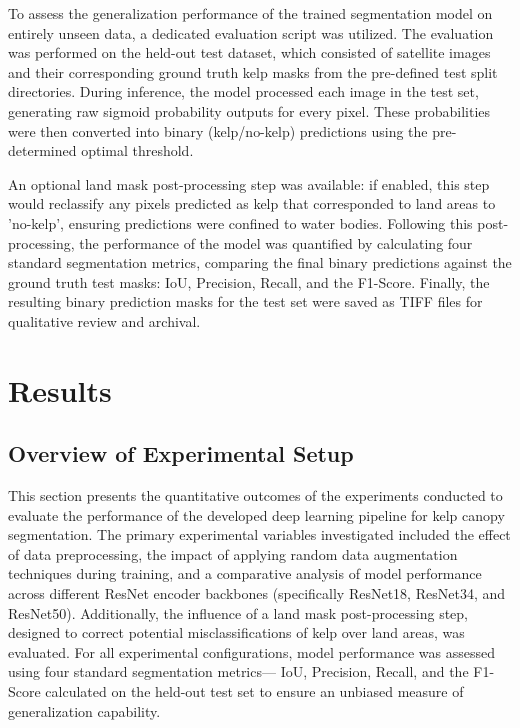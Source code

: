 \documentclass{article}
\begin{document}
To assess the generalization performance of the trained segmentation model on entirely unseen data, a dedicated evaluation script was utilized. The evaluation was performed on the held-out test dataset, which consisted of satellite images and their corresponding ground truth kelp masks from the pre-defined test split directories. During inference, the model processed each image in the test set, generating raw sigmoid probability outputs for every pixel. These probabilities were then converted into binary (kelp/no-kelp) predictions using the pre-determined optimal threshold. 

An optional land mask post-processing step was available: if enabled, this step would reclassify any pixels predicted as kelp that corresponded to land areas to 'no-kelp', ensuring predictions were confined to water bodies. Following this post-processing, the performance of the model was quantified by calculating four standard segmentation metrics, comparing the final binary predictions against the ground truth test masks: IoU, Precision, Recall, and the F1-Score. Finally, the resulting binary prediction masks for the test set were saved as TIFF files for qualitative review and archival.

\section{Results}

\subsection{Overview of Experimental Setup} %

This section presents the quantitative outcomes of the experiments conducted to evaluate the performance of the developed deep learning pipeline for kelp canopy segmentation. The primary experimental variables investigated included the effect of data preprocessing, the impact of applying random data augmentation techniques during training, and a comparative analysis of model performance across different ResNet encoder backbones (specifically ResNet18, ResNet34, and ResNet50). Additionally, the influence of a land mask post-processing step, designed to correct potential misclassifications of kelp over land areas, was evaluated. For all experimental configurations, model performance was assessed using four standard segmentation metrics— IoU, Precision, Recall, and the F1-Score calculated on the held-out test set to ensure an unbiased measure of generalization capability.
\end{document}
